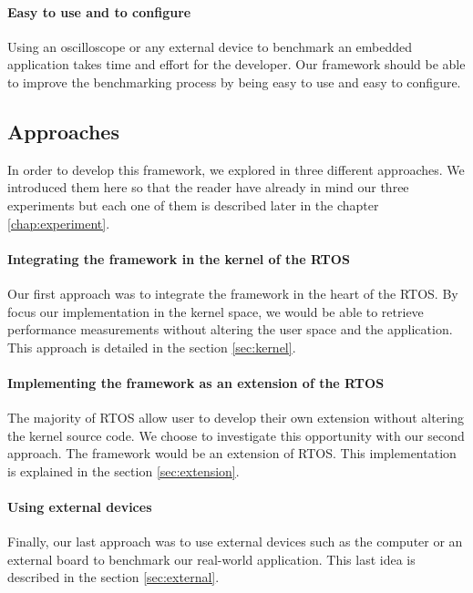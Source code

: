 \paragraph{Easy to use and to configure}
Using an oscilloscope or any external device to benchmark an embedded application takes time and effort for the developer.
Our framework should be able to improve the benchmarking process by being easy to use and easy to configure.

\subsection{Approaches}

In order to develop this framework, we explored in three different approaches.
We introduced them here so that the reader have already in mind our three experiments but each one of them is described later in the chapter \ref{chap:experiment}.

\paragraph{Integrating the framework in the kernel of the RTOS}
Our first approach was to integrate the framework in the heart of the RTOS.
By focus our implementation in the kernel space, we would be able to retrieve performance measurements without altering the user space and the application.
This approach is detailed in the section \ref{sec:kernel}.

\paragraph{Implementing the framework as an extension of the RTOS}
The majority of RTOS allow user to develop their own extension without altering the kernel source code.
We choose to investigate this opportunity with our second approach.
The framework would be an extension of RTOS.
This implementation is explained in the section \ref{sec:extension}.

\paragraph{Using external devices}
Finally, our last approach was to use external devices such as the computer or an external board to benchmark our real-world application.
This last idea is described in the section \ref{sec:external}.
